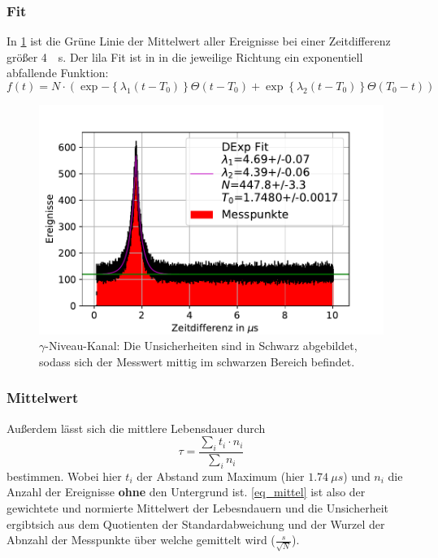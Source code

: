 \documentclass[
	a4paper,
	12pt,
	pagesize,
	ngerman
]{scrartcl}
\begin{document}
		\subsubsection*{Fit}
		In \cref{fig_zeitdifferenz} ist die Grüne Linie der Mittelwert aller Ereignisse bei einer Zeitdifferenz größer \SI{4}{\mu s}.
		Der lila Fit ist in in die jeweilige Richtung ein exponentiell abfallende Funktion:
		\begin{equation}
			\label{eq_dexp}
			f(t)=N\cdot (\exp{-\left\{\lambda_1(t-T_0)\right\}}\Theta(t-T_0)+\exp{\left\{\lambda_2(t-T_0)\right\}}\Theta(T_0-t))
		\end{equation}
	\begin{figure}[H]
				\includegraphics[width= 0.9 \linewidth]{img/Zeitdifferenzen}
				\caption{
					$\gamma$-Niveau-Kanal:
				Die Unsicherheiten sind in Schwarz abgebildet, sodass sich der Messwert mittig im schwarzen Bereich befindet.
				}
				\label{fig_zeitdifferenz}
		\end{figure}
		\subsubsection*{Mittelwert}
		Außerdem lässt sich die mittlere Lebensdauer durch
		\begin{equation}
			\label{eq_mittel}
			\tau = \frac{\sum_i t_i \cdot n_i}{\sum_i n_i}
		\end{equation}
		bestimmen.
		Wobei hier $t_i$ der Abstand zum Maximum (hier $\SI{1.74}{\mu s}$) und $n_i$ die Anzahl der Ereignisse \textbf{ohne} den Untergrund ist.
		\cref{eq_mittel} ist also der gewichtete und normierte Mittelwert der Lebesndauern und die Unsicherheit ergibtsich aus dem Quotienten der Standardabweichung und der Wurzel der Abnzahl der Messpunkte über welche gemittelt wird ($\frac{s}{\sqrt{N}}$).
\end{document}
